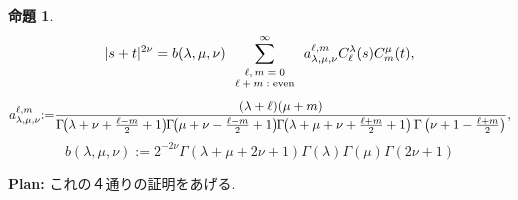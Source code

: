\documentclass[pdf,notes]{beamer}
\newcommand{\tmop}[1]{\ensuremath{\operatorname{#1}}}
\newtheorem{prop}{命題}
\newtheorem{remark}{注}
\begin{document}
\begin{frame}
	\begin{prop}\label{prop:exp-st-gg}
		\begin{equation}
			| s + t |^{2 \nu} =b(\lambda,\mu,\nu) \sum_{\mbox{\scriptsize $\begin{array}[]{c}
			\ell, m = 0 \\ \ell + m : \tmop{even}
		\end{array}$}}^{\infty} a_{\lambda,\mu,\nu}^{\ell,m} C_\ell^{\lambda} (s) C_m^{\mu} (t),
			\label{eqn:exp-st-gg}
		\end{equation}
		{\scriptsize
		\begin{equation*}
	a_{\lambda,\mu,\nu}^{\ell,m}\kern-0.1cm:= \kern-0.1cm\frac{ (\lambda + \ell) (\mu + m)   }{\Gamma \kern-0.1cm\left( \lambda + \nu + \frac{\ell -
  m}{2} + 1 \right)  \kern-0.1cm\Gamma \kern-0.1cm\left( \mu + \nu -
  \frac{\ell - m}{2} + 1 \right)\kern-0.1cm\Gamma \kern-0.1cm\left( \lambda + \mu + \nu + \frac{\ell +
  m}{2} + 1 \right)\Gamma\left(  \nu+1-\frac{\ell+m}{2}\right)},\end{equation*}
  \begin{equation*}
  b(\lambda,\mu,\nu):=2^{-2\nu}\Gamma (\lambda + \mu + 2 \nu + 1){\Gamma (\lambda)
  \Gamma (\mu)\Gamma \left( 2\nu +
1 \right)}
		\end{equation*}
	}
	\end{prop}
	{\bf Plan:} これの４通りの証明をあげる.
\end{frame}
\end{document}
